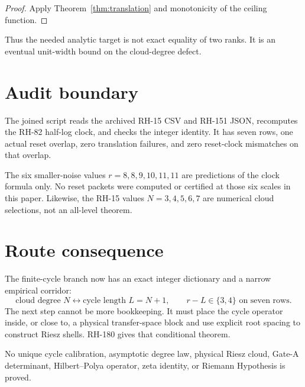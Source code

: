 \documentclass[12pt]{article}
\theoremstyle{remark}
\begin{document}
\begin{proof}
Apply Theorem~\ref{thm:translation} and monotonicity of the ceiling function.
\end{proof}

Thus the needed analytic target is not exact equality of two ranks.  It is an
eventual unit-width bound on the cloud-degree defect.

\section{Audit boundary}

The joined script reads the archived RH-15 CSV and RH-151 JSON, recomputes the
RH-82 half-log clock, and checks the integer identity.  It has seven rows, one
actual reset overlap, zero translation failures, and zero reset-clock
mismatches on that overlap.

The six smaller-noise values $r=8,8,9,10,11,11$ are predictions of the clock
formula only.  No reset packets were computed or certified at those six
scales in this paper.  Likewise, the RH-15 values $N=3,4,5,6,7$ are numerical
cloud selections, not an all-level theorem.

\section{Route consequence}

The finite-cycle branch now has an exact integer dictionary and a narrow
empirical corridor:
\[
 \text{cloud degree }N
 \leftrightarrow
 \text{cycle length }L=N+1,
 \qquad
 r-L\in\{3,4\}\text{ on seven rows}.
\]
The next step cannot be more bookkeeping.  It must place the cycle operator
inside, or close to, a physical transfer-space block and use explicit root
spacing to construct Riesz shells.  RH-180 gives that conditional theorem.

No unique cycle calibration, asymptotic degree law, physical Riesz cloud,
Gate-A determinant, Hilbert--Polya operator, zeta identity, or Riemann
Hypothesis is proved.



\end{document}
